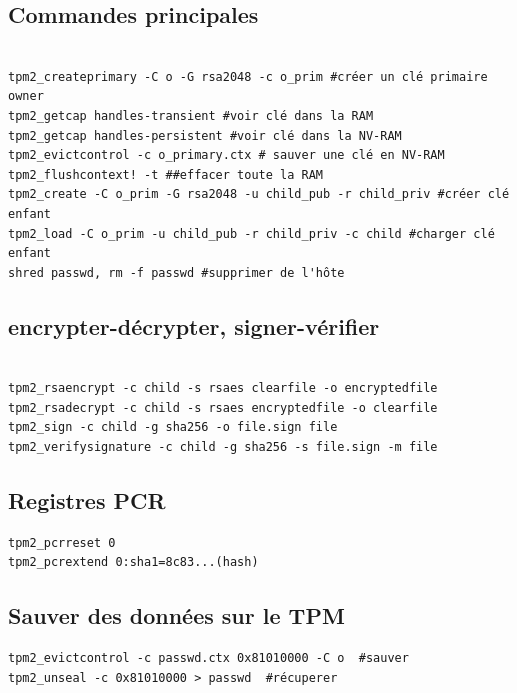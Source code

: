 \documentclass[resume]{subfiles}
\begin{document}
\subsection{Commandes principales}
\begin{lstlisting}[style=bash]

tpm2_createprimary -C o -G rsa2048 -c o_prim #créer un clé primaire owner
tpm2_getcap handles-transient #voir clé dans la RAM
tpm2_getcap handles-persistent #voir clé dans la NV-RAM
tpm2_evictcontrol -c o_primary.ctx # sauver une clé en NV-RAM
tpm2_flushcontext! -t ##effacer toute la RAM
tpm2_create -C o_prim -G rsa2048 -u child_pub -r child_priv #créer clé enfant
tpm2_load -C o_prim -u child_pub -r child_priv -c child #charger clé enfant
shred passwd, rm -f passwd #supprimer de l'hôte

\end{lstlisting}

\subsection{encrypter-décrypter, signer-vérifier}
\begin{lstlisting}[style=bash]

tpm2_rsaencrypt -c child -s rsaes clearfile -o encryptedfile
tpm2_rsadecrypt -c child -s rsaes encryptedfile -o clearfile
tpm2_sign -c child -g sha256 -o file.sign file
tpm2_verifysignature -c child -g sha256 -s file.sign -m file
\end{lstlisting}

\subsection{Registres PCR}

\begin{lstlisting}[style=bash]
tpm2_pcrreset 0
tpm2_pcrextend 0:sha1=8c83...(hash)
\end{lstlisting}

\subsection{Sauver des données sur le TPM}

\begin{lstlisting}[style=bash]
tpm2_evictcontrol -c passwd.ctx 0x81010000 -C o  #sauver
tpm2_unseal -c 0x81010000 > passwd  #récuperer
\end{lstlisting}
\end{document}
